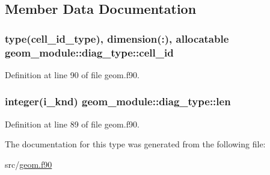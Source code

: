 \subsection{Member Data Documentation}
\hypertarget{structgeom__module_1_1diag__type_a4a224a6b718e7f700346107791b76c68}{
\subsubsection[{cell\-\_\-id}]{\setlength{\rightskip}{0pt plus 5cm}type({\bf cell\-\_\-id\-\_\-type}), dimension(\-:), allocatable geom\-\_\-module\-::diag\-\_\-type\-::cell\-\_\-id}}\label{structgeom__module_1_1diag__type_a4a224a6b718e7f700346107791b76c68}


Definition at line 90 of file geom.\-f90.

\hypertarget{structgeom__module_1_1diag__type_aea93a15b2b174bdfdc9912a201bd48e4}{
\subsubsection[{len}]{\setlength{\rightskip}{0pt plus 5cm}integer(i\-\_\-knd) geom\-\_\-module\-::diag\-\_\-type\-::len}}\label{structgeom__module_1_1diag__type_aea93a15b2b174bdfdc9912a201bd48e4}


Definition at line 89 of file geom.\-f90.



The documentation for this type was generated from the following file\-:\begin{DoxyCompactItemize}
\item 
src/\hyperlink{geom_8f90}{geom.\-f90}\end{DoxyCompactItemize}
